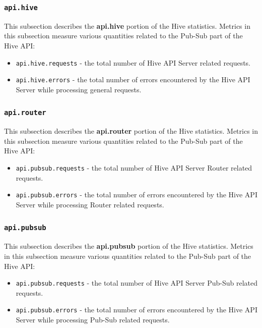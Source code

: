 \documentclass[a4paper]{article}
\begin{document}
\subsubsection{\texttt{api.hive}}
\label{sec-4-2-16}

This subsection describes the \textbf{api.hive} portion of the Hive statistics. Metrics in this subsection measure various quantities related to the Pub-Sub part of the Hive API:


\begin{itemize}
\item \texttt{api.hive.requests} - the total number of Hive API Server related requests.
\item \texttt{api.hive.errors} - the total number of errors encountered by the Hive API Server while processing general requests.
\end{itemize}
\subsubsection{\texttt{api.router}}
\label{sec-4-2-17}

This subsection describes the \textbf{api.router} portion of the Hive statistics. Metrics in this subsection measure various quantities related to the Pub-Sub part of the Hive API:


\begin{itemize}
\item \texttt{api.pubsub.requests} - the total number of Hive API Server Router related requests.
\item \texttt{api.pubsub.errors} - the total number of errors encountered by the Hive API Server while processing Router related requests.
\end{itemize}
\subsubsection{\texttt{api.pubsub}}
\label{sec-4-2-18}

This subsection describes the \textbf{api.pubsub} portion of the Hive statistics. Metrics in this subsection measure various quantities related to the Pub-Sub part of the Hive API:


\begin{itemize}
\item \texttt{api.pubsub.requests} - the total number of Hive API Server Pub-Sub related requests.
\item \texttt{api.pubsub.errors} - the total number of errors encountered by the Hive API Server while processing Pub-Sub related requests.
\end{itemize}
\end{document}
